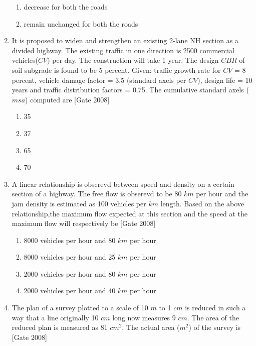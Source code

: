 \documentclass[journal]{IEEEtran}
\begin{document}
\begin{enumerate}
\begin{multicols}{2}
\begin{enumerate}
		\item decrease for both the roads
		\item remain unchanged for both the roads
	\end{enumerate}
\end{multicols}
	\item It is proposed to widen and strengthen an existing 2-lane NH section as a divided highway. The existing traffic in one direction is 2500 commercial vehicles($CV$) per day. The construction will take 1 year. The design $CBR$ of soil subgrade is found to be 5 percent. Given: traffic growth rate for $CV$ = 8 percent, vehicle damage factor = 3.5 (standard axels per $CV$), design life = 10 years and traffic distribution factors = 0.75. The cumulative standard axels ($msa$) computed are  \hfill [Gate 2008]
\begin{multicols}{4}
	\begin{enumerate}
		\item 35
		\item 37
		\item 65
		\item 70
	\end{enumerate}
\end{multicols}	
	\item A linear relationship is obserevd between speed and density on a certain section of a highway. The free flow is obserevd to be 80 $km$ per hour and the jam density is estimated as 100 vehicles per $km$ length. Based on the above relationship,the maximum flow expected at this section and the speed at the maximum flow will respectively be  \hfill [Gate 2008]
\begin{multicols}{2} 
	\begin{enumerate}
		\item 8000 vehicles per hour and 80 $km$ per hour
		\item 8000 vehicles per hour and 25 $km$ per hour
		\item 2000 vehicles per hour and 80 $km$ per hour
		\item 2000 vehicles per hour and 40 $km$ per hour
	\end{enumerate}
\end{multicols}	
	\item The plan of a survey plotted to a scale of 10 $m$ to 1 $cm$ is reduced in such a way that a line originally 10 $cm$ long now measures 9 $cm$. The area of the reduced plan is measured as 81 $cm^2$. The actual area ($m^2$) of the survey is  \hfill [Gate 2008]
\begin{multicols}{4}

\end{multicols}
\end{enumerate}
\end{document}
